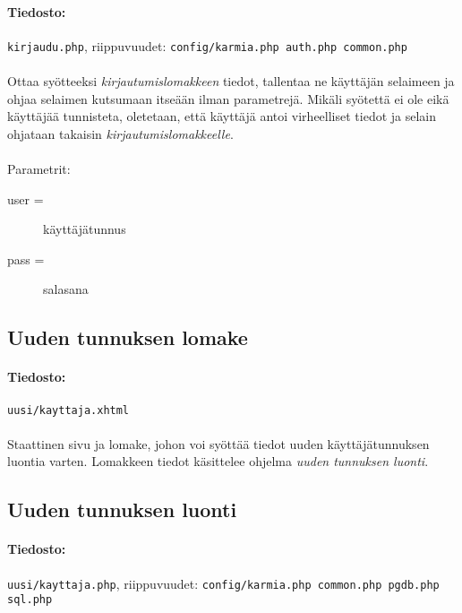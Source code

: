 \documentclass[11pt]{article}
\begin{document}
\paragraph{Tiedosto:} \large{\texttt{kirjaudu.php}}, riippuvuudet: \texttt{config/karmia.php auth.php common.php}

\paragraph{} Ottaa syötteeksi \emph{kirjautumislomakkeen} tiedot, tallentaa ne käyttäjän selaimeen ja ohjaa selaimen kutsumaan itseään ilman parametrejä. Mikäli syötettä ei ole eikä käyttäjää tunnisteta, oletetaan, että käyttäjä antoi virheelliset tiedot ja selain ohjataan takaisin \emph{kirjautumislomakkeelle}.

\paragraph{} Parametrit:
\begin{description}
\item[user =] käyttäjätunnus
\item[pass =] salasana
\end{description}


\subsection{Uuden tunnuksen lomake}

\paragraph{Tiedosto:} \large{\texttt{uusi/kayttaja.xhtml}}

\paragraph{} Staattinen sivu ja lomake, johon voi syöttää tiedot uuden käyttäjätunnuksen luontia varten. Lomakkeen tiedot käsittelee ohjelma \emph{uuden tunnuksen luonti}.


\subsection{Uuden tunnuksen luonti}

\paragraph{Tiedosto:} \large{\texttt{uusi/kayttaja.php}}, riippuvuudet: \texttt{config/karmia.php common.php pgdb.php sql.php}
\end{document}
